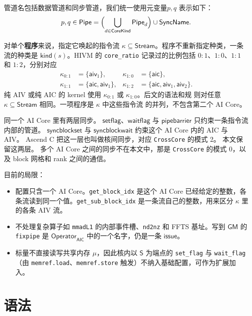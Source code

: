 \documentclass[UTF8,a4paper,11pt,fontset=fandol]{ctexart}
\newcommand{\kw}[1]{\ensuremath{\mathsf{#1}}}
\begin{document}
管道名包括数据管道和同步管道，我们统一使用元变量$p,q$ 表示如下：
\begin{equation}
\label{eq:pipe}
p,q\in\mathsf{Pipe}
  =\Bigl(\bigcup_{d\in\mathsf{CoreKind}}\mathsf{Pipe}_d\Bigr)
   \cup\mathsf{SyncName}.
\end{equation}



对单个\textbf{程序}来说，指定它唤起的指令流 $\kappa\subseteq\mathsf{Stream}$。程序不重新指定种类，一条流的种类是 $\mathsf{kind}(s)$。HIVM 的 \texttt{core\_ratio} 记录过的比例包括 $0{:}1$、$1{:}0$、$1{:}1$ 和 $1{:}2$，分别对应
\[
\begin{aligned}
\kappa_{0:1}&=\{\mathsf{aiv}_1\},&
\kappa_{1:0}&=\{\mathsf{aic}\},\\
\kappa_{1:1}&=\{\mathsf{aic},\mathsf{aiv}_1\},&
\kappa_{1:2}&=\{\mathsf{aic},\mathsf{aiv}_1,\mathsf{aiv}_2\}.
\end{aligned}
\]
纯 AIV 或纯 AIC 的 kernel 使用 $\kappa_{0:1}$ 或 $\kappa_{1:0}$。后文的语法和规
则对任意 $\kappa\subseteq\mathsf{Stream}$ 相同。一项程序是 $\kappa$ 中这些指令流
的并列，不包含第二个 AI Core。

同一个 AI Core 里有两层同步。
\kw{setflag}、\kw{waitflag} 与 \kw{pipebarrier} 只约束一条指令流内部的管道。
\kw{syncblockset} 与 \kw{syncblockwait} 约束这个 AI Core 内的 AIC 与 AIV。
Ascend C 把这一层也叫做核间同步，对应 \texttt{CrossCore} 的模式 2。
本文保留这两层。
多个 AI Core 之间的同步不在本文中，那是 \texttt{CrossCore} 的模式 0，以及 block 网格和 rank 之间的通信。

目前的局限：
\begin{itemize}
\item 配置只含一个 AI Core。\texttt{get\_block\_idx} 是这个 AI Core 已经给定的整数，各条流读到同一个值。\texttt{get\_sub\_block\_idx} 是一条流自己的整数，用来区分 $\kappa$ 里的各条 AIV 流。
\item 不处理复杂算子如 \texttt{mmadL1} 的内部事件槽、\texttt{nd2nz} 和 FFTS 基址。写到 $\mathsf{GM}$ 的 \texttt{fixpipe} 是 $\mathsf{Operator}_{\mathsf{AIC}}$ 中的一个名字，仍是一条 \kw{issue}。
\item 标量不直接读写共享内存 $\mu$，因此核内以 $\mathsf{S}$ 为端点的 \texttt{set\_flag} 与 \texttt{wait\_flag}（由 \texttt{memref.load}、\texttt{memref.store} 触发）不纳入基础配置，可作为扩展加入。
\end{itemize}

\section{语法}
\end{document}
